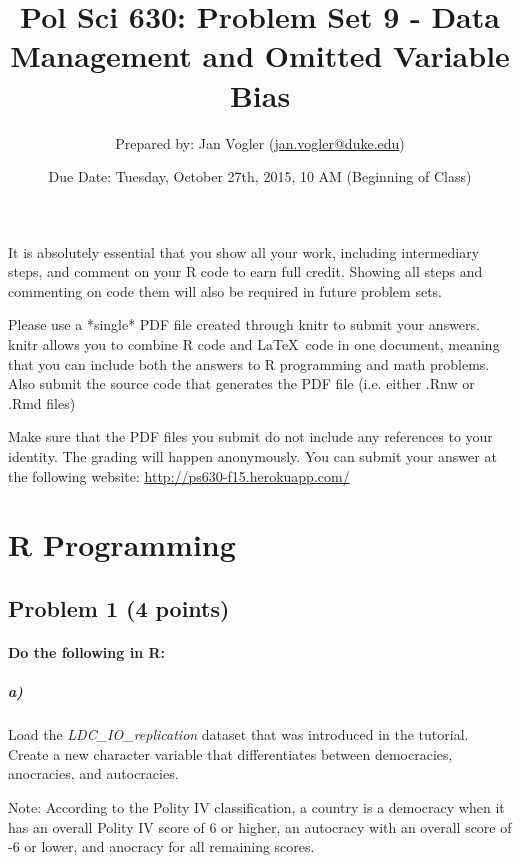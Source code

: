 \documentclass[12pt]{article}
\begin{document}
\title{Pol Sci 630: Problem Set 9 - Data Management and Omitted Variable Bias}

\author{Prepared by: Jan Vogler (\href{mailto:jan.vogler@duke.edu}{jan.vogler@duke.edu})}

\date{Due Date: Tuesday, October 27th, 2015, 10 AM (Beginning of Class)}
 
\maketitle 



It is absolutely essential that you show all your work, including intermediary steps, and comment on your R code to earn full credit. Showing all steps and commenting on code them will also be required in future problem sets.

Please use a *single* PDF file created through knitr to submit your answers. knitr allows you to combine R code and \LaTeX \ code in one document, meaning that you can include both the answers to R programming and math problems. Also submit the source code that generates the PDF file (i.e. either .Rnw or .Rmd files)

Make sure that the PDF files you submit do not include any references to your identity. The grading will happen anonymously. You can submit your answer at the following website: \url{http://ps630-f15.herokuapp.com/}



\section*{R Programming}

\subsection*{Problem 1 (4 points)}

\paragraph{Do the following in R:}

\subparagraph{a)} Load the \textit{LDC\_IO\_replication} dataset that was introduced in the tutorial. Create a new character variable that differentiates between democracies, anocracies, and autocracies.

Note: According to the Polity IV classification, a country is a democracy when it has an overall Polity IV score of 6 or higher, an autocracy with an overall score of -6 or lower, and anocracy for all remaining scores.
\end{document}
